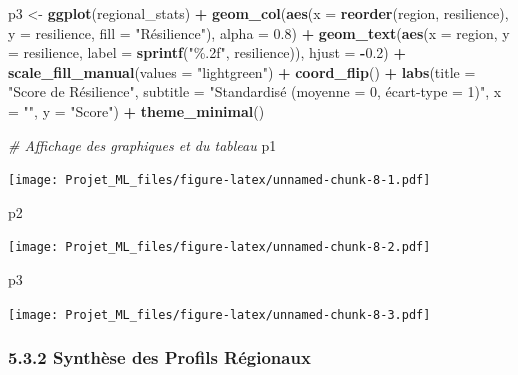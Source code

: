 \documentclass[
]{article}
\newenvironment{Shaded}{\begin{snugshade}}{\end{snugshade}}
\newcommand{\AttributeTok}[1]{\textcolor[rgb]{0.13,0.29,0.53}{#1}}
\newcommand{\CommentTok}[1]{\textcolor[rgb]{0.56,0.35,0.01}{\textit{#1}}}
\newcommand{\FloatTok}[1]{\textcolor[rgb]{0.00,0.00,0.81}{#1}}
\newcommand{\FunctionTok}[1]{\textcolor[rgb]{0.13,0.29,0.53}{\textbf{#1}}}
\newcommand{\NormalTok}[1]{#1}
\newcommand{\OtherTok}[1]{\textcolor[rgb]{0.56,0.35,0.01}{#1}}
\newcommand{\SpecialCharTok}[1]{\textcolor[rgb]{0.81,0.36,0.00}{\textbf{#1}}}
\newcommand{\StringTok}[1]{\textcolor[rgb]{0.31,0.60,0.02}{#1}}
\begin{document}
\begin{Shaded}
\begin{Highlighting}[]
\NormalTok{p3 }\OtherTok{\textless{}{-}} \FunctionTok{ggplot}\NormalTok{(regional\_stats) }\SpecialCharTok{+}
  \FunctionTok{geom\_col}\NormalTok{(}\FunctionTok{aes}\NormalTok{(}\AttributeTok{x =} \FunctionTok{reorder}\NormalTok{(region, resilience), }\AttributeTok{y =}\NormalTok{ resilience, }
               \AttributeTok{fill =} \StringTok{"Résilience"}\NormalTok{), }\AttributeTok{alpha =} \FloatTok{0.8}\NormalTok{) }\SpecialCharTok{+}
  \FunctionTok{geom\_text}\NormalTok{(}\FunctionTok{aes}\NormalTok{(}\AttributeTok{x =}\NormalTok{ region, }\AttributeTok{y =}\NormalTok{ resilience,}
                \AttributeTok{label =} \FunctionTok{sprintf}\NormalTok{(}\StringTok{"\%.2f"}\NormalTok{, resilience)), }\AttributeTok{hjust =} \SpecialCharTok{{-}}\FloatTok{0.2}\NormalTok{) }\SpecialCharTok{+}
  \FunctionTok{scale\_fill\_manual}\NormalTok{(}\AttributeTok{values =} \StringTok{"lightgreen"}\NormalTok{) }\SpecialCharTok{+}
  \FunctionTok{coord\_flip}\NormalTok{() }\SpecialCharTok{+}
  \FunctionTok{labs}\NormalTok{(}\AttributeTok{title =} \StringTok{"Score de Résilience"}\NormalTok{,}
       \AttributeTok{subtitle =} \StringTok{"Standardisé (moyenne = 0, écart{-}type = 1)"}\NormalTok{,}
       \AttributeTok{x =} \StringTok{""}\NormalTok{, }\AttributeTok{y =} \StringTok{"Score"}\NormalTok{) }\SpecialCharTok{+}
  \FunctionTok{theme\_minimal}\NormalTok{()}

\CommentTok{\# Affichage des graphiques et du tableau}
\NormalTok{p1}
\end{Highlighting}
\end{Shaded}

\texttt{[image: Projet\_ML\_files/figure-latex/unnamed-chunk-8-1.pdf]}

\begin{Shaded}
\begin{Highlighting}[]
\NormalTok{p2}
\end{Highlighting}
\end{Shaded}

\texttt{[image: Projet\_ML\_files/figure-latex/unnamed-chunk-8-2.pdf]}

\begin{Shaded}
\begin{Highlighting}[]
\NormalTok{p3}
\end{Highlighting}
\end{Shaded}

\texttt{[image: Projet\_ML\_files/figure-latex/unnamed-chunk-8-3.pdf]}

\subsubsection{5.3.2 Synthèse des Profils
Régionaux}\label{synthuxe8se-des-profils-ruxe9gionaux}
\end{document}
